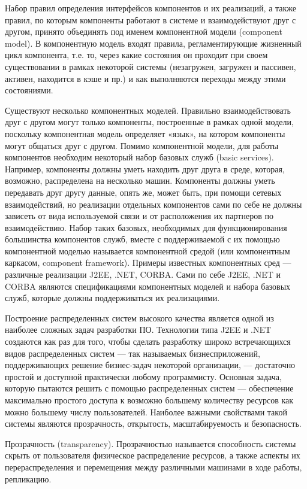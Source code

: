 Набор правил определения интерфейсов компонентов и их реализаций, а также правил, по которым компоненты работают в системе и взаимодействуют друг с другом, принято объединять под именем компонентной модели (component model). В компонентную модель входят правила, регламентирующие жизненный цикл компонента, т.е. то, через какие состояния он проходит при своем существовании в рамках некоторой системы (незагружен, загружен и пассивен, активен, находится в кэше и пр.) и как выполняются переходы между этими состояниями. 

Существуют несколько компонентных моделей. Правильно взаимодействовать друг с другом могут только компоненты, построенные в рамках одной модели, поскольку компонентная модель определяет «язык», на котором компоненты могут общаться друг с другом. Помимо компонентной модели, для работы компонентов необходим некоторый набор базовых служб (basic services). Например, компоненты должны уметь находить друг друга в среде, которая, возможно, распределена на несколько машин. Компоненты должны уметь передавать друг другу данные, опять же, может быть, при помощи сетевых взаимодействий, но реализации отдельных компонентов сами по себе не должны зависеть от вида используемой связи и от расположения их партнеров по взаимодействию. Набор таких базовых, необходимых для функционирования большинства компонентов служб, вместе с поддерживаемой с их помощью компонентной моделью называется компонентной средой (или компонентным каркасом, component framework). Примеры известных компонентных сред — различные реализации J2EE, .NET, CORBA. Сами по себе J2EE, .NET и CORBA являются спецификациями компонентных моделей и набора базовых служб, которые должны поддерживаться их реализациями.

Построение распределенных систем высокого качества является одной из наиболее сложных задач разработки ПО. Технологии типа J2EE и .NET создаются как раз для того, чтобы сделать разработку широко встречающихся видов распределенных систем — так называемых бизнесприложений, поддерживающих решение бизнес-задач некоторой организации, — достаточно простой и доступной практически любому программисту. Основная задача, которую пытаются решить с помощью распределенных систем — обеспечение максимально простого доступа к возможно большему количеству ресурсов как можно большему числу пользователей. Наиболее важными свойствами такой системы являются прозрачность, открытость, масштабируемость и безопасность. 

\begin{opr}
  Прозрачность (transparency). Прозрачностью называется способность системы скрыть от пользователя физическое распределение ресурсов, а также аспекты их перераспределения и перемещения между различными машинами в ходе работы, репликацию.
\end{opr}

